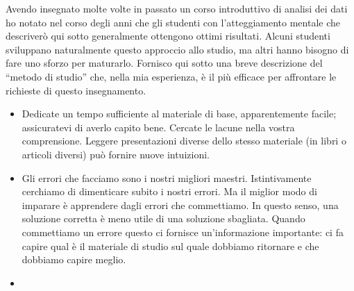 \documentclass[
  11pt,
]{krantz}
\providecommand{\tightlist}{%
  \setlength{\itemsep}{0pt}\setlength{\parskip}{0pt}}
\theoremstyle{definition}
\theoremstyle{definition}
\theoremstyle{definition}
\theoremstyle{definition}
\theoremstyle{remark}
\begin{document}
Avendo insegnato molte volte in passato un corso introduttivo di analisi dei dati ho notato nel corso degli anni che gli studenti con l'atteggiamento mentale che descriverò qui sotto generalmente ottengono ottimi risultati. Alcuni studenti sviluppano naturalmente questo approccio allo studio, ma altri hanno bisogno di fare uno sforzo per maturarlo. Fornisco qui sotto una breve descrizione del ``metodo di studio'' che, nella mia esperienza, è il più efficace per affrontare le richieste di questo insegnamento.

\begin{itemize}
\tightlist
\item
  Dedicate un tempo sufficiente al materiale di base, apparentemente facile; assicuratevi di averlo capito bene. Cercate le lacune nella vostra comprensione. Leggere presentazioni diverse dello stesso materiale (in libri o articoli diversi) può fornire nuove intuizioni.
\item
  Gli errori che facciamo sono i nostri migliori maestri. Istintivamente cerchiamo di dimenticare subito i nostri errori. Ma il miglior modo di imparare è apprendere dagli errori che commettiamo. In questo senso, una soluzione corretta è meno utile di una soluzione sbagliata. Quando commettiamo un errore questo ci fornisce un'informazione importante: ci fa capire qual è il materiale di studio sul quale dobbiamo ritornare e che dobbiamo capire meglio.
\item

\end{itemize}
\end{document}
